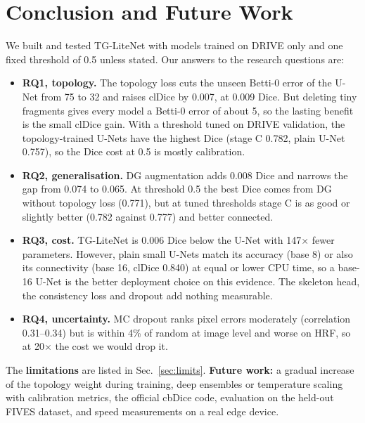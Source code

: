 \documentclass[conference]{IEEEtran}
\begin{document}
\section{Conclusion and Future Work}
We built and tested TG-LiteNet with models trained on DRIVE only and one fixed threshold of 0.5 unless stated. Our answers to the research questions are:
\begin{itemize}
\item \textbf{RQ1, topology.} The topology loss cuts the unseen Betti-0 error of the U-Net from 75 to 32 and raises clDice by 0.007, at 0.009 Dice. But deleting tiny fragments gives every model a Betti-0 error of about 5, so the lasting benefit is the small clDice gain. With a threshold tuned on DRIVE validation, the topology-trained U-Nets have the highest Dice (stage C 0.782, plain U-Net 0.757), so the Dice cost at 0.5 is mostly calibration.
\item \textbf{RQ2, generalisation.} DG augmentation adds 0.008 Dice and narrows the gap from 0.074 to 0.065. At threshold 0.5 the best Dice comes from DG without topology loss (0.771), but at tuned thresholds stage C is as good or slightly better (0.782 against 0.777) and better connected.
\item \textbf{RQ3, cost.} TG-LiteNet is 0.006 Dice below the U-Net with 147$\times$ fewer parameters. However, plain small U-Nets match its accuracy (base 8) or also its connectivity (base 16, clDice 0.840) at equal or lower CPU time, so a base-16 U-Net is the better deployment choice on this evidence. The skeleton head, the consistency loss and dropout add nothing measurable.
\item \textbf{RQ4, uncertainty.} MC dropout ranks pixel errors moderately (correlation 0.31--0.34) but is within 4\% of random at image level and worse on HRF, so at 20$\times$ the cost we would drop it.
\end{itemize}
The \textbf{limitations} are listed in Sec.~\ref{sec:limits}. \textbf{Future work:} a gradual increase of the topology weight during training, deep ensembles or temperature scaling with calibration metrics, the official cbDice code, evaluation on the held-out FIVES dataset, and speed measurements on a real edge device.
\end{document}
